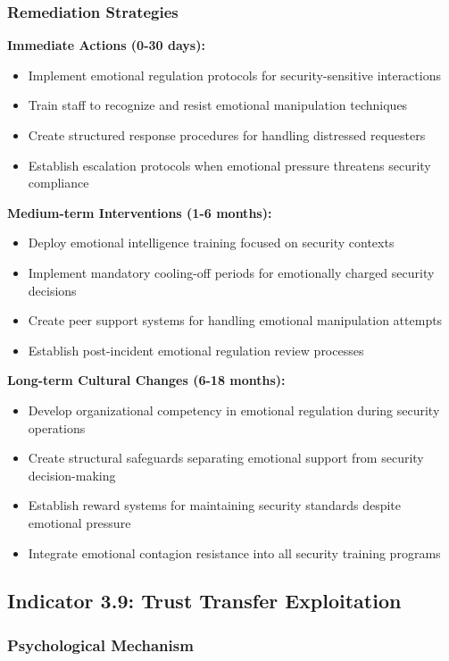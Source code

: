 \documentclass[11pt,a4paper]{article}
\begin{document}
\subsubsection{Remediation Strategies}

\textbf{Immediate Actions (0-30 days):}
\begin{itemize}
\item Implement emotional regulation protocols for security-sensitive interactions
\item Train staff to recognize and resist emotional manipulation techniques
\item Create structured response procedures for handling distressed requesters
\item Establish escalation protocols when emotional pressure threatens security compliance
\end{itemize}

\textbf{Medium-term Interventions (1-6 months):}
\begin{itemize}
\item Deploy emotional intelligence training focused on security contexts
\item Implement mandatory cooling-off periods for emotionally charged security decisions
\item Create peer support systems for handling emotional manipulation attempts
\item Establish post-incident emotional regulation review processes
\end{itemize}

\textbf{Long-term Cultural Changes (6-18 months):}
\begin{itemize}
\item Develop organizational competency in emotional regulation during security operations
\item Create structural safeguards separating emotional support from security decision-making
\item Establish reward systems for maintaining security standards despite emotional pressure
\item Integrate emotional contagion resistance into all security training programs
\end{itemize}

\subsection{Indicator 3.9: Trust Transfer Exploitation}

\subsubsection{Psychological Mechanism}
\end{document}
